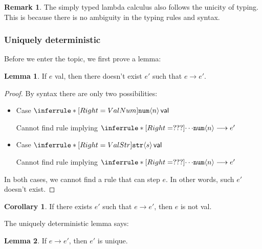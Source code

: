 \documentclass{article}
\theoremstyle{definition}
\newtheorem{lemma}{Lemma}[section]
\newtheorem*{remark}{Remark}
\newtheorem{corollary}{Corollary}[section]
\newcommand{\ip}[1]{\langle #1 \rangle}
\begin{document}
\begin{remark}
    The simply typed lambda calculus also follows the unicity of typing. This is because there is no ambiguity in the typing rules and syntax.
\end{remark}

\subsubsection*{Uniquely deterministic}

Before we enter the topic, we first prove a lemma:

\begin{lemma}
    \label{lem:valorstep}
    If $e$ \textsf{val}, then there doesn't exist $e'$ such that $e\longrightarrow e'$.
\end{lemma}

\begin{proof}
    By syntax there are only two possibilities:
    \begin{itemize}
        \item Case $\inferrule*[Right=ValNum]{ }{\mathtt{num}\ip{n}\, \mathsf{val}}$

              Cannot find rule implying $\inferrule*[Right=???]{\cdots}{\mathtt{num}\ip{n}\longrightarrow e'}$

        \item Case $\inferrule*[Right=ValStr]{ }{\mathtt{str}\ip{s}\, \mathsf{val}}$

              Cannot find rule implying $\inferrule*[Right=???]{\cdots}{\mathtt{num}\ip{n}\longrightarrow e'}$

    \end{itemize}
    In both cases, we cannot find a rule that can step $e$.
    In other words, such $e'$ doesn't exist.
\end{proof}

\begin{corollary}
    \label{cor:uniquedet}
    If there exists $e'$ such that $e\longrightarrow e'$, then $e$ is not \textsf{val}.
\end{corollary}

The uniquely deterministic lemma says:
\begin{lemma}
    If $e\longrightarrow e'$, then $e'$ is unique.
\end{lemma}
\end{document}
